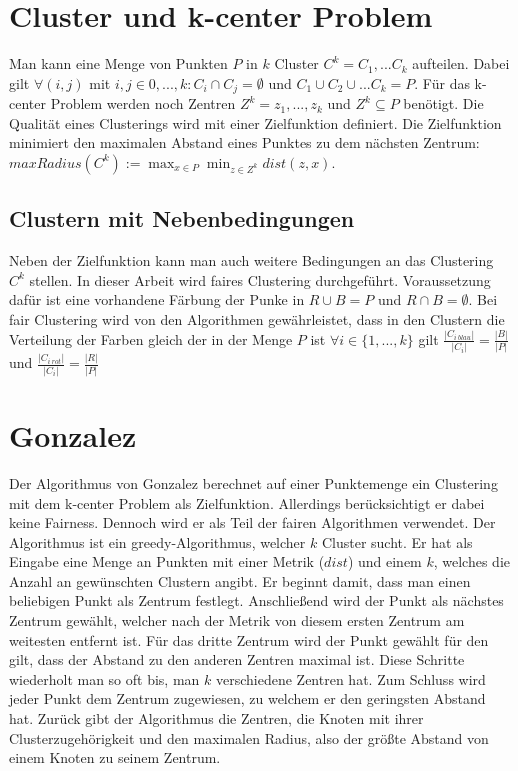 \section{Cluster und k-center Problem}
    Man kann eine Menge von Punkten $P$ in $k$ Cluster $C^k = {C_1, ... C_k}$ aufteilen. Dabei gilt $\forall (i, j)$ mit $i, j \in {0, ..., k}: C_i \cap C_j = \emptyset$ und $C_1 \cup C_2 \cup ... C_k = P$. Für das k-center Problem werden noch Zentren $Z^k = {z_1, ..., z_k}$ und $Z^k \subseteq P$ benötigt. Die Qualität eines Clusterings wird mit einer Zielfunktion definiert. Die Zielfunktion minimiert den maximalen Abstand eines Punktes zu dem nächsten Zentrum: $\displaystyle maxRadius(C^k) := \max_{x \in P} \min_{z \in Z^k} dist(z, x)$.

    \subsection{Clustern mit Nebenbedingungen}
        Neben der Zielfunktion kann man auch weitere Bedingungen an das Clustering $C^k$ stellen. In dieser Arbeit wird faires Clustering durchgeführt. Voraussetzung dafür ist eine vorhandene Färbung der Punke in $R \cup B = P$ und $R \cap B = \emptyset$. Bei fair Clustering wird von den Algorithmen gewährleistet, dass in den Clustern die Verteilung der Farben gleich der in der Menge $P$ ist $\forall i \in \{1, ..., k\}$ gilt $\frac{|C_{i\ blau}|}{|C_i|} = \frac{|B|}{|P|}$ und $\frac{|C_{i\ rot}|}{|C_i|} = \frac{|R|}{|P|}$



\section{Gonzalez}\label{sec:gonzalez}
    Der Algorithmus von Gonzalez \cite{GONZALEZ1985293} berechnet auf einer Punktemenge ein Clustering mit dem k-center Problem als Zielfunktion. Allerdings berücksichtigt er dabei keine Fairness. Dennoch wird er als Teil der fairen Algorithmen verwendet.
    Der Algorithmus ist ein greedy-Algorithmus, welcher $k$ Cluster sucht. Er hat als Eingabe eine Menge an Punkten mit einer Metrik ($dist$) und einem $k$, welches die Anzahl an gewünschten Clustern angibt.
    Er beginnt damit, dass man einen beliebigen Punkt als Zentrum festlegt. Anschließend wird der Punkt als nächstes Zentrum gewählt, welcher nach der Metrik von diesem ersten Zentrum am weitesten entfernt ist. Für das dritte Zentrum wird der Punkt gewählt für den gilt, dass der Abstand zu den anderen Zentren maximal ist. Diese Schritte wiederholt man so oft bis, man $k$ verschiedene Zentren hat.
    Zum Schluss wird jeder Punkt dem Zentrum zugewiesen, zu welchem er den geringsten Abstand hat. 
    Zurück gibt der Algorithmus die Zentren, die Knoten mit ihrer Clusterzugehörigkeit und den maximalen Radius, also der größte Abstand von einem Knoten zu seinem Zentrum.

